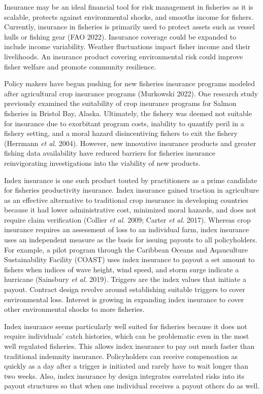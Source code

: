 \documentclass[
  letterpaper,
  DIV=11,
  numbers=noendperiod]{scrartcl}
\theoremstyle{plain}
\theoremstyle{plain}
\theoremstyle{remark}
\begin{document}
Insurance may be an ideal financial tool for risk management in
fisheries as it is scalable, protects against environmental shocks, and
smooths income for fishers. Currently, insurance in fisheries is
primarily used to protect assets such as vessel hulls or fishing gear
(FAO 2022). Insurance coverage could be expanded to include income
variability. Weather fluctuations impact fisher income and their
livelihoods. An insurance product covering environmental risk could
improve fisher welfare and promote community resilience.

Policy makers have begun pushing for new fisheries insurance programs
modeled after agricultural crop insurance programs (Murkowski 2022). One
research study previously examined the suitability of crop insurance
programs for Salmon fisheries in Bristol Bay, Alaska. Ultimately, the
fishery was deemed not suitable for insurance due to exorbitant program
costs, inability to quantify peril in a fishery setting, and a moral
hazard disincentiving fishers to exit the fishery (Herrmann \emph{et
al.} 2004). However, new innovative insurance products and greater
fishing data availability have reduced barriers for fisheries insurance
reinvigorating investigations into the viability of new products.

Index insurance is one such product touted by practitioners as a prime
candidate for fisheries productivity insurance. Index insurance gained
traction in agriculture as an effective alternative to traditional crop
insurance in developing countries because it had lower administrative
cost, minimized moral hazards, and does not require claim verification
(Collier \emph{et al.} 2009; Carter \emph{et al.} 2017). Whereas crop
insurance requires an assessment of loss to an individual farm, index
insurance uses an independent measure as the basis for issuing payouts
to all policyholders. For example, a pilot program through the Caribbean
Oceans and Aqauculture Sustainability Facility (COAST) uses index
insurance to payout a set amount to fishers when indices of wave height,
wind speed, and storm surge indicate a hurricane (Sainsbury \emph{et
al.} 2019). Triggers are the index values that initiate a payout.
Contract design revolve around establishing suitable triggers to cover
environmental loss. Interest is growing in expanding index insurance to
cover other environmental shocks to more fisheries.

Index insurance seems particularly well suited for fisheries because it
does not require individuals' catch histories, which can be problematic
even in the most well regulated fisheries. This allows index insurance
to pay out much faster than traditional indemnity insurance.
Policyholders can receive compensation as quickly as a day after a
trigger is initiated and rarely have to wait longer than two weeks.
Also, index insurance by design integrates correlated risks into its
payout structures so that when one individual receives a payout others
do as well.
\end{document}
